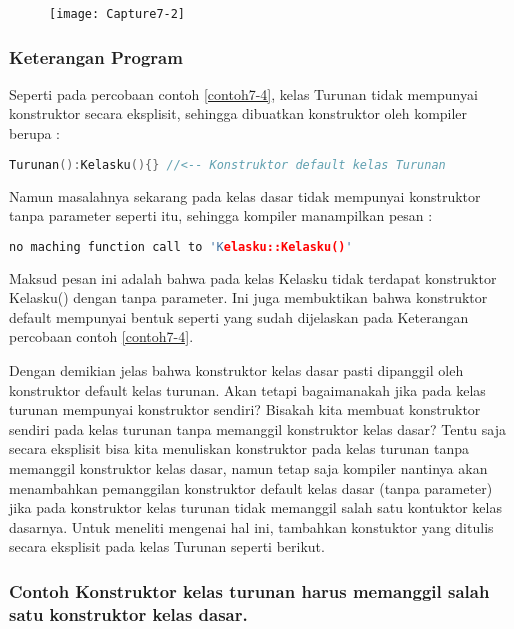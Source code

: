 \begin{figure}[htbp]
\centering
\texttt{[image: Capture7-2]}

\end{figure}

\subsubsection*{Keterangan Program}

Seperti pada percobaan contoh \ref{contoh7-4}, kelas Turunan tidak mempunyai
konstruktor secara eksplisit, sehingga dibuatkan konstruktor oleh
kompiler berupa :

\begin{lstlisting}[language=c++, numbers=none]
Turunan():Kelasku(){} //<-- Konstruktor default kelas Turunan
\end{lstlisting}

Namun masalahnya sekarang pada kelas dasar tidak mempunyai konstruktor
tanpa parameter seperti itu, sehingga kompiler manampilkan pesan :

\begin{lstlisting}[language=c++, numbers=none]
no maching function call to 'Kelasku::Kelasku()'
\end{lstlisting}

Maksud pesan ini adalah bahwa pada kelas Kelasku tidak terdapat
konstruktor Kelasku() dengan tanpa parameter. Ini juga membuktikan bahwa
konstruktor default mempunyai bentuk seperti yang sudah dijelaskan pada
Keterangan percobaan contoh \ref{contoh7-4}.

Dengan demikian jelas bahwa konstruktor kelas dasar pasti dipanggil oleh
konstruktor default kelas turunan. Akan tetapi bagaimanakah jika pada
kelas turunan mempunyai konstruktor sendiri? Bisakah kita membuat
konstruktor sendiri pada kelas turunan tanpa memanggil konstruktor kelas
dasar? Tentu saja secara eksplisit bisa kita menuliskan konstruktor pada
kelas turunan tanpa memanggil konstruktor kelas dasar, namun tetap saja
kompiler nantinya akan menambahkan pemanggilan konstruktor default kelas
dasar (tanpa parameter) jika pada konstruktor kelas turunan tidak
memanggil salah satu kontuktor kelas dasarnya. Untuk meneliti mengenai
hal ini, tambahkan konstuktor yang ditulis secara eksplisit pada kelas
Turunan seperti berikut.

\subsubsection*{Contoh Konstruktor kelas turunan harus memanggil salah satu konstruktor kelas dasar.}

